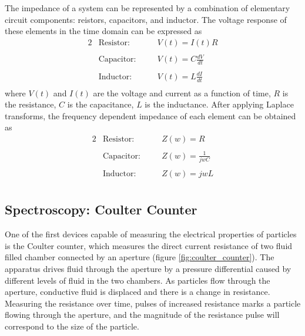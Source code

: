  \par The impedance of a system can be represented by a combination of elementary circuit components: reistors, capacitors, and inductor. The voltage response of these elements in the time domain can be expressed as
 \begin{alignat}{2}
    &\text{Resistor:} \quad  &&V(t) = I(t)R \label{eqn:ohms_law}\\\nonumber\\
    &\text{Capacitor:} \quad &&V(t) = C \frac{dV}{dt}\\\nonumber\\
    &\text{Inductor:} \quad  &&V(t) = L \frac{dI}{dt}\\\nonumber
 \end{alignat}
 \noindent where $V(t)$ and $I(t)$ are the voltage and current as a function of time, $R$ is the resistance, $C$ is the capacitance, $L$ is the inductance. After applying Laplace transforms, the frequency dependent impedance of each element can be obtained as
  \begin{alignat}{2}
    &\text{Resistor:} \quad  &&Z(w) = R \;\;\;\\\nonumber\\
    &\text{Capacitor:} \quad &&Z(w) = \frac{1}{jwC}\\\nonumber\\
    &\text{Inductor:} \quad  &&Z(w) = jwL\\\nonumber
 \end{alignat}

\subsection*{Spectroscopy: Coulter Counter}
\par One of the first devices capable of measuring the electrical properties of particles is the Coulter counter, which measures the direct current resistance of two fluid filled chamber connected by an aperture (figure \ref{fig:coulter_counter}). The apparatus drives fluid through the aperture by a pressure differential caused by different levels of fluid in the two chambers. As particles flow through the aperture, conductive fluid is displaced and there is a change in resistance. Measuring the resistance over time, pulses of increased resistance marks a particle flowing through the aperture, and the magnitude of the resistance pulse will correspond to the size of the particle. 


